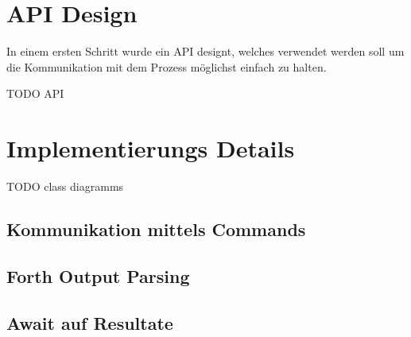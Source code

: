 \section{API Design}

In einem ersten Schritt wurde ein API designt, welches verwendet werden soll um die Kommunikation mit dem Prozess möglichst einfach zu halten.

TODO API

\section{Implementierungs Details}

TODO class diagramms

\subsection{Kommunikation mittels Commands}

\subsection{Forth Output Parsing}

\subsection{Await auf Resultate}

